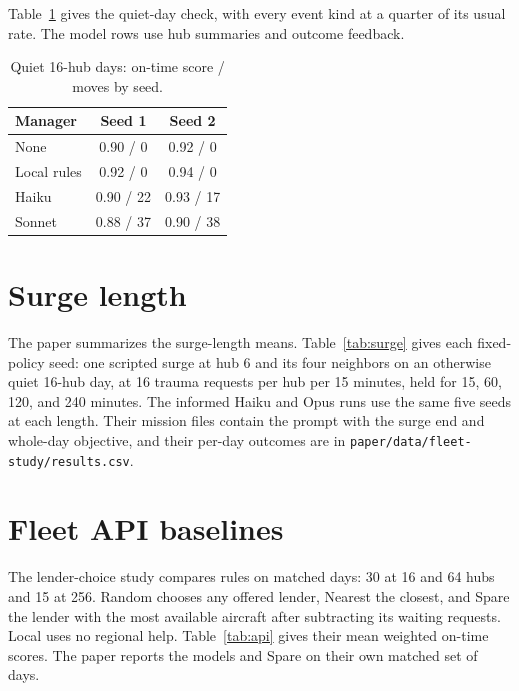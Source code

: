 \documentclass[conference]{IEEEtran}
\begin{document}
Table~\ref{tab:quiet} gives the quiet-day check, with every event kind
at a quarter of its usual rate. The model rows use hub summaries and
outcome feedback.

\begin{table}[h]
\caption{Quiet 16-hub days: on-time score / moves by seed.}
\label{tab:quiet}
\centering
\footnotesize
\begin{tabular}{@{}lcc@{}}
\toprule
Manager & Seed 1 & Seed 2 \\
\midrule
None & 0.90 / 0 & 0.92 / 0 \\
Local rules & 0.92 / 0 & 0.94 / 0 \\
Haiku & 0.90 / 22 & 0.93 / 17 \\
Sonnet & 0.88 / 37 & 0.90 / 38 \\
\bottomrule
\end{tabular}
\end{table}

\section{Surge length}
\label{app:surge}

The paper summarizes the surge-length means. Table~\ref{tab:surge}
gives each fixed-policy seed: one scripted surge at hub 6 and its four
neighbors on an
otherwise quiet 16-hub day, at 16 trauma requests per hub per 15 minutes,
held for 15, 60, 120, and 240 minutes.
The informed Haiku and Opus runs use the same five seeds at each length.
Their mission files contain the prompt with the surge end and whole-day
objective, and their per-day outcomes are in
\texttt{paper/data/fleet-study/results.csv}.

\begin{table}[h]
\caption{Per-seed on-time score by surge length and policy.}
\label{tab:surge}
\centering
\footnotesize
\setlength{\tabcolsep}{4pt}

\end{table}

\section{Fleet API baselines}

The lender-choice study compares rules on matched days: 30 at 16 and
64 hubs and 15 at 256. Random chooses any offered lender, Nearest the
closest, and Spare the lender with the most available aircraft after
subtracting its waiting requests. Local uses no regional help.
Table~\ref{tab:api} gives their mean weighted on-time scores. The
paper reports the models and Spare on their own matched set of days.
\end{document}

